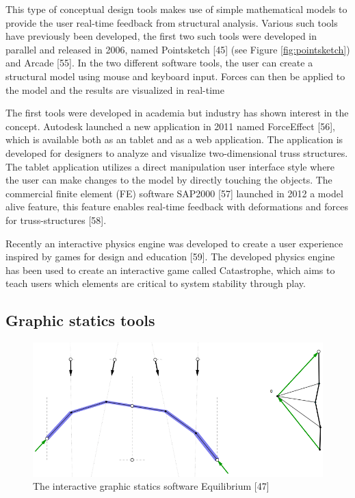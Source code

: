 This type of conceptual design tools makes use of simple mathematical models to provide the user real-time feedback from structural analysis. Various such tools have previously been developed, the first two such tools were developed in parallel and released in 2006, named Pointsketch [45] (see Figure \ref{fig:pointsketch}) and Arcade [55]. In the two different software tools, the user can create a structural model using mouse and keyboard input. Forces can then be applied to the model and the results are visualized in real-time 

The first tools were developed in academia but industry has shown interest in the concept. Autodesk launched a new application in 2011 named ForceEffect [56], which is available both as an tablet and as a web application. The application is developed for designers to analyze and visualize two-dimensional truss structures. The tablet application utilizes a direct manipulation user interface style where the user can make changes to the model by directly touching the objects. The commercial finite element (FE) software SAP2000 [57] launched in 2012 a model alive feature, this feature enables real-time feedback with deformations and forces for truss-structures [58].

Recently an interactive physics engine was developed to create a user experience inspired by games for design and education [59]. The developed physics engine has been used to create an interactive game called Catastrophe, which aims to teach users which elements are critical to system stability through play.

\subsection{Graphic statics tools}

\begin{figure}
  \includegraphics[width=330pt]{graphics/equilibrium.png}
  \caption{The interactive graphic statics software Equilibrium [47]}
  \label{fig:equilibrium}
\end{figure}

